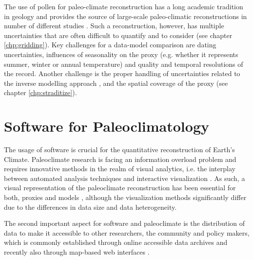 \begin{refsection}
The use of pollen for paleo-climate reconstruction has a long academic tradition in geology \citep{Bradley1985} and provides the source of large-scale paleo-climatic reconstructions in number of different studies \citep[and more]{MauriDavisCollinsEtAl2015, DavisBrewerStevensonEtAl2003, MarsicekShumanBartleinEtAl2018, FischerJungclaus2011}. Such a reconstruction, however, has multiple uncertainties that are often difficult to quantify and to consider (see chapter \ref{chp:gridding}). Key challenges for a data-model comparison are dating uncertainties, influences of seasonality on the proxy (e.g. whether it represents summer, winter or annual temperature) and quality and temporal resolutions of the record. Another challenge is the proper handling of uncertainties related to the inverse modelling approach \citep[e.g.][]{GuiotVernal2011, TelfordBirks2009, TelfordBirks2005}, and the spatial coverage of the proxy (see chapter \ref{chp:straditize}).


\section{Software for Paleoclimatology} \label{sec:intro-software}

The usage of software is crucial for the quantitative reconstruction of Earth's Climate. Paleoclimate research is facing an information overload problem and requires innovative methods in the realm of visual analytics, i.e. the interplay between automated analysis techniques and interactive visualization \citep{KeimAndrienkoFeketeEtAl2008, Nocke2014}. As such, a visual representation of the paleoclimate reconstruction has been essential for both, proxies \citep{Nichols1967, Bradley1985, Grimm1988} and models \citep{Phillips1956, RautenhausBoettingerSiemenEtAl2018, NockeSterzelBoettingerEtAl2008, Nocke2014, BoettingerRoeber2019}, although the visualization methods significantly differ due to the differences in data size and data heterogeneity.

The second important aspect for software and paleoclimate is the distribution of data to make it accessible to other researchers, the community and policy makers, which is commonly established through online accessible data archives and recently also through map-based web interfaces \citep{WilliamsGrimmBloisEtAl2018, BollietBrockmannMassonDelmotteEtAl2016}.


\end{refsection}
